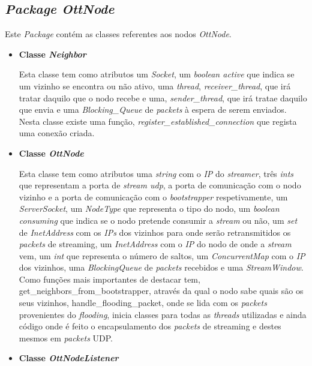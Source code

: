\documentclass[a4paper, 11pt]{article}
\begin{document}
\subsection{\textit{Package OttNode}}

Este \textit{Package} contém as classes referentes aos nodos \textit{OttNode}.

\begin{itemize}

    \item \textbf{Classe \textit{Neighbor}}
    
    Esta classe tem como atributos um \textit{Socket}, um \textit{boolean active} que indica se um vizinho se encontra ou não ativo, uma \textit{thread}, \textit{receiver\_thread}, que irá tratar daquilo que o nodo recebe e uma, \textit{sender\_thread}, que irá tratae daquilo que envia e uma \textit{Blocking\_Queue} de \textit{packets} à espera de serem enviados. Nesta classe existe uma função, \textit{register\_established\_connection} que regista uma conexão criada.
    
    \item \textbf{Classe \textit{OttNode}}
    
    Esta classe tem como atributos uma \textit{string} com o \textit{IP} do \textit{streamer}, três \textit{ints} que representam a porta de \textit{stream udp}, a porta de comunicação com o nodo vizinho e a porta de comunicação com o \textit{bootstrapper} respetivamente, um \textit{ServerSocket}, um \textit{NodeType} que representa o tipo do nodo, um \textit{boolean consuming} que indica se o nodo pretende consumir a \textit{stream} ou não, um \textit{set} de \textit{InetAddress} com os \textit{IPs} dos vizinhos para onde serão retransmitidos os \textit{packets} de streaming, um \textit{InetAddress} com o \textit{IP} do nodo de onde a \textit{stream} vem, um \textit{int} que representa o número de saltos, um \textit{ConcurrentMap} com o \textit{IP} dos vizinhos, uma \textit{BlockingQueue} de \textit{packets} recebidos e uma \textit{StreamWindow}. Como funções mais importantes de destacar tem, get\_neighbors\_from\_bootstrapper, através da qual o nodo sabe quais são os seus vizinhos, handle\_flooding\_packet, onde se lida com os \textit{packets} provenientes do \textit{flooding}, inicia classes para todas as \textit{threads} utilizadas e ainda código onde é feito o encapsulamento dos \textit{packets} de streaming e destes mesmos em \textit{packets} UDP.
    
    \item \textbf{Classe \textit{OttNodeListener}}
    

\end{itemize}
\end{document}
